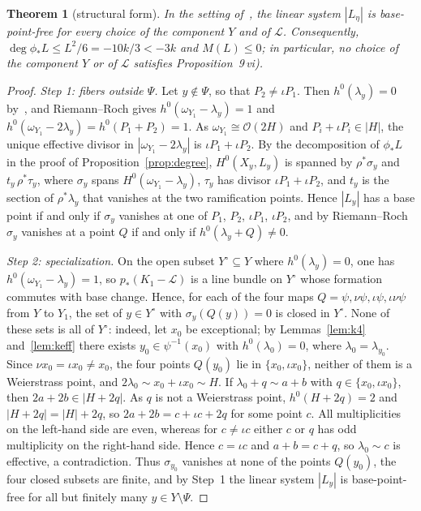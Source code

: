 \documentclass[11pt]{article}
\newtheorem{theorem}{Theorem}[section]
\theoremstyle{definition}
\theoremstyle{remark}
\newcommand{\OO}{\mathcal{O}}
\newcommand{\cL}{\mathcal{L}}
\begin{document}
\begin{theorem}[structural form]\label{thm:soule-structural}
In the setting of~\cite{So26}, the linear system $|L_\eta|$ is base-point-free for
every choice of the component $Y$ and of $\cL$. Consequently,
$\deg\phi_*L\le L^2/6=-10k/3<-3k$ and $M(L)\le 0$; in particular, no choice of the
component $Y$ or of $\cL$ satisfies Proposition~9\,vi).
\end{theorem}

\begin{proof}
\emph{Step 1: fibers outside $\Psi$.} Let $y\notin\Psi$, so that $P_2\ne\iota P_1$.
Then $h^0(\lambda_y)=0$ by~\cite[Prop.~5\,ii)]{So26}, and Riemann--Roch gives
$h^0(\omega_{Y_1}-\lambda_y)=1$ and $h^0(\omega_{Y_1}-2\lambda_y)=h^0(P_1+P_2)=1$.
As $\omega_{Y_1}\cong\OO(2H)$ and $P_i+\iota P_i\in|H|$, the unique effective
divisor in $|\omega_{Y_1}-2\lambda_y|$ is $\iota P_1+\iota P_2$. By the
decomposition of $\phi_*L$ in the proof of Proposition~\ref{prop:degree},
$H^0(X_y,L_y)$ is spanned by $\rho^*\sigma_y$ and $t_y\,\rho^*\tau_y$, where
$\sigma_y$ spans $H^0(\omega_{Y_1}-\lambda_y)$, $\tau_y$ has divisor
$\iota P_1+\iota P_2$, and $t_y$ is the section of $\rho^*\lambda_y$ that vanishes
at the two ramification points. Hence $|L_y|$ has a base point if and only if
$\sigma_y$ vanishes at one of $P_1$, $P_2$, $\iota P_1$, $\iota P_2$, and by
Riemann--Roch $\sigma_y$ vanishes at a point $Q$ if and only if
$h^0(\lambda_y+Q)\ne 0$.

\emph{Step 2: specialization.} On the open subset $Y^\circ\subseteq Y$ where
$h^0(\lambda_y)=0$, one has $h^0(\omega_{Y_1}-\lambda_y)=1$, so $p_*(K_1-\cL)$ is
a line bundle on $Y^\circ$ whose formation commutes with base change. Hence, for
each of the four maps $Q=\psi,\nu\psi,\iota\psi,\iota\nu\psi$ from $Y$ to $Y_1$,
the set of $y\in
Y^\circ$ with $\sigma_y(Q(y))=0$ is closed in $Y^\circ$. None of these sets is all
of $Y^\circ$: indeed, let $x_0$ be exceptional; by Lemmas~\ref{lem:k4}
and~\ref{lem:keff} there exists $y_0\in\psi^{-1}(x_0)$ with $h^0(\lambda_0)=0$,
where $\lambda_0=\lambda_{y_0}$. Since $\nu x_0=\iota x_0\ne x_0$, the four points
$Q(y_0)$ lie in $\{x_0,\iota
x_0\}$, neither of them is a Weierstrass point, and $2\lambda_0\sim x_0+\iota
x_0\sim H$. If $\lambda_0+q\sim a+b$ with $q\in\{x_0,\iota x_0\}$, then
$2a+2b\in|H+2q|$. As $q$ is not a Weierstrass point, $h^0(H+2q)=2$ and
$|H+2q|=|H|+2q$, so $2a+2b=c+\iota c+2q$ for some point $c$. All multiplicities on
the left-hand side are even, whereas for $c\ne\iota c$ either $c$ or $q$ has odd
multiplicity on the right-hand side. Hence $c=\iota c$ and $a+b=c+q$, so
$\lambda_0\sim c$ is effective, a contradiction. Thus $\sigma_{y_0}$ vanishes at
none of the points $Q(y_0)$, the four closed subsets are finite, and by Step~1 the
linear system $|L_y|$ is base-point-free for all but finitely many
$y\in Y\setminus\Psi$.


\end{proof}
\end{document}
